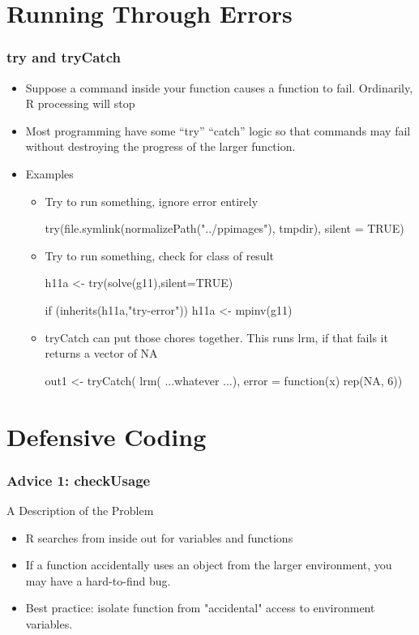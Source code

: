 \documentclass[10pt,english]{beamer}
\begin{document}
\section{Running Through Errors}

\begin{frame}
  \frametitle{try and tryCatch}
  \begin{itemize}
    \item Suppose a command inside your function causes a function to fail.
      Ordinarily, R processing will stop
    \item Most programming have some ``try'' ``catch'' logic so that
      commands may fail without destroying the progress of the larger function.
    \item Examples
      \begin{itemize}
        \item Try to run something, ignore error entirely
\begin{Sinput}          
try(file.symlink(normalizePath("../ppimages"), tmpdir), silent = TRUE)
\end{Sinput}
    \item Try to run something, check for class of result
\begin{Sinput}          
h11a <- try(solve(g11),silent=TRUE)

if (inherits(h11a,"try-error")) {
          h11a <- mpinv(g11)
}
\end{Sinput}

   \item tryCatch can put those chores together. This runs lrm, if
     that fails it returns a vector of NA
\begin{Sinput}     
out1 <- tryCatch( lrm( ...whatever ...), error = function(x) {rep(NA, 6)})
\end{Sinput}  
\end{itemize}
\end{itemize}
\end{frame}



\section{Defensive Coding}

\begin{frame}[containsverbatim]
  \frametitle{Advice 1: checkUsage}
  A Description of the Problem
  \begin{itemize}

  \item R searches from inside out for variables and functions
  \item If a function accidentally uses an object from the larger
    environment, you may have a hard-to-find bug. 

  \item Best practice: isolate function from "accidental" access to
    environment variables.
  \end{itemize}
\end{frame}
\end{document}
